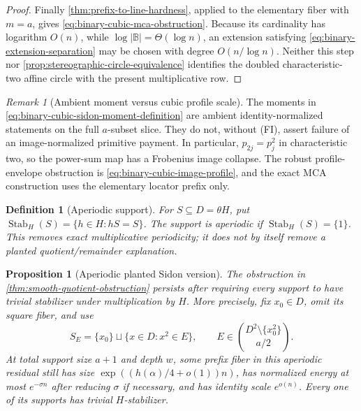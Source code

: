 \documentclass[12pt,a4paper]{amsart}
\numberwithin{equation}{section}
\newtheorem{proposition}[proposition]{Proposition}
\newtheorem{definition}[definition]{Definition}
\theoremstyle{remark}
\newtheorem{remark}[remark]{Remark}
\newcommand{\B}{\mathbb B}
\newcommand{\abs}[1]{\lvert #1\rvert}
\begin{document}
\begin{proof}
Finally \cref{thm:prefix-to-line-hardness}, applied to the elementary
fiber with \(m=a\), gives \eqref{eq:binary-cubic-mca-obstruction}.
Because its cardinality has logarithm \(O(n)\), while
\(\log\abs\B=\Theta(\log n)\), an extension satisfying
\eqref{eq:binary-extension-separation} may be chosen with degree
\(O(n/\log n)\).  Neither this step nor
\cref{prop:stereographic-circle-equivalence} identifies the doubled
characteristic-two affine circle with the present multiplicative row.
\end{proof}

\begin{remark}[Ambient moment versus cubic profile scale]
\label{rem:binary-ambient-image}
The moments in \eqref{eq:binary-cubic-sidon-moment-definition} are
ambient identity-normalized statements on the full \(a\)-subset slice.
They do not, without \textup{(FI)}, assert failure of an
image-normalized primitive payment.  In particular,
\(p_{2j}=p_j^2\) in characteristic two, so the power-sum map has a
Frobenius image collapse.  The robust profile-envelope obstruction is
\eqref{eq:binary-cubic-image-profile}, and the exact MCA construction uses
the elementary locator prefix only.
\end{remark}

\begin{definition}[Aperiodic support]
\label{def:aperiodic-support}
For \(S\subseteq D=\theta H\), put
\(\operatorname{Stab}_H(S)=\{h\in H:hS=S\}\).  The support is
\emph{aperiodic} if \(\operatorname{Stab}_H(S)=\{1\}\).  This removes
exact multiplicative periodicity; it does not by itself remove a planted
quotient/remainder explanation.
\end{definition}

\begin{proposition}[Aperiodic planted Sidon version]
\label{prop:aperiodic-planted-obstruction}
The obstruction in \cref{thm:smooth-quotient-obstruction} persists after
requiring every support to have trivial stabilizer under multiplication by
\(H\).  More precisely, fix \(x_0\in D\), omit its square fiber, and use
\[
 S_E=\{x_0\}\sqcup\{x\in D:x^2\in E\},
 \qquad
 E\in\binom{D^2\setminus\{x_0^2\}}{a/2}.
 \tag{6.12}\label{eq:aperiodic-planted-family}
\]
At total support size \(a+1\) and depth \(w\), some prefix fiber in this
aperiodic residual still has size
\(\exp((h(\alpha)/4+o(1))n)\), has normalized energy at most
\(e^{-\sigma n}\) after reducing \(\sigma\) if necessary, and has identity
scale \(e^{o(n)}\).  Every one of its supports has trivial \(H\)-stabilizer.
\end{proposition}
\end{document}
